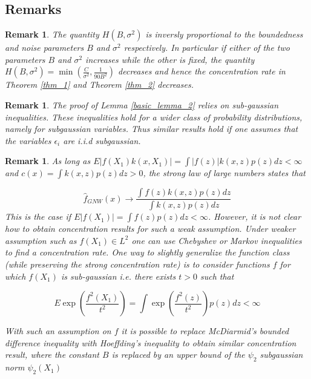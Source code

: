 \documentclass{article}
\newtheorem{remark}[theorem]{Remark}
\begin{document}
\subsection{Remarks}

\begin{remark}
The quantity $H(B,\sigma^2)$ is inversly proportional to the boundedness and noise parameters $B$ and $\sigma^2$ respectively. In particular if either of the two parameters $B$ and $\sigma^2$ increases while the other is fixed, the quantity  $H(B,\sigma^2)=\min(\frac{C}{\sigma^2},\frac{1}{90B^2})$ decreases and hence the concentration rate in Theorem \ref{thm_1} and Theorem \ref{thm_2} decreases.
\end{remark}


\begin{remark}
The proof of Lemma \ref{basic_lemma_2} relies on sub-gaussian inequalities. These inequalities hold for a wider class of probability distributions, namely for subgaussian variables. Thus similar results hold if one assumes that the variables $\epsilon_i$ are i.i.d subgaussian.
\end{remark}

\begin{remark}
As long as $E|f(X_1)k(x,X_1)|=\int |f(z)|k(x,z)p(z)dz<\infty $ and $c(x)=\int k(x,z)p(z)dz>0$, the strong law of large numbers states that 

\begin{equation*}
    \hat{f}_{GNW}(x)\rightarrow \frac{\int f(z)k(x,z)p(z)dz}{\int k(x,z)p(z)dz}
\end{equation*}
This is the case if $E|f(X_1)|=\int f(z)p(z)dz<\infty$.
However, it is not clear how to obtain concentration results for such a weak assumption. Under weaker assumption such as $f(X_1)\in L^2$ one can use Chebyshev or Markov inequalities to find a concentration rate.  One way to slightly generalize the function class (while preserving the strong concentration rate) is to consider functions $f$ for which $f(X_1)$ is sub-gaussian i.e. there exists $t>0$ such that 

\begin{equation*}
    E\exp(\frac{f^2(X_1)}{t^2})=\int \exp(\frac{f^2(z)}{t^2})p(z)dz<\infty  
\end{equation*}

With such an assumption on $f$ it is possible to replace McDiarmid's bounded difference inequality with Hoeffding's inequality to obtain similar concentration result, where the constant $B$ is replaced by an upper bound of the $\psi_2$ subgaussian norm $\psi_2(X_1)$
\end{remark}
\end{document}
